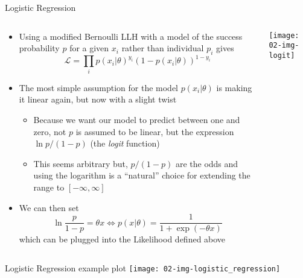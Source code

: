   \begin{frame}{Logistic Regression}
    \begin{columns}
      \begin{column}{0.65\textwidth}
        \begin{itemize}
          \item Using a modified Bernoulli LLH with a model of the success probability $p$ for a given $x_i$ rather than individual $p_i$ gives
          \begin{equation*}
            \mathcal{L} = \prod_i
              p(x_i | \theta)^{y_i} (1 − p(x_i | \theta))^{1 − y_i}
          \end{equation*}
          \item The most simple assumption for the model $p(x_i | \theta)$ is making it linear again, but now with a slight twist
          \begin{itemize}
            \item Because we want our model to predict between one and zero, not $p$ is assumed to be linear, but the expression $\ln{p / (1 - p)}$ (the \emph{logit} function)
            \item This seems arbitrary but, $p / (1 - p)$ are the odds and using the logarithm is a \enquote{natural} choice for extending the range to $[-\infty, \infty]$
          \end{itemize}
          \item We can then set
            \begin{equation}
              \ln \frac{p}{1 - p} = \theta x \Leftrightarrow
                p(x | \theta) = \frac{1}{1 + \exp(-\theta x)}
            \end{equation}
            which can be plugged into the Likelihood defined above
        \end{itemize}
      \end{column}
      \begin{column}{0.35\textwidth}
        \vspace{1em}

        \texttt{[image: 02-img-logit]}
      \end{column}
    \end{columns}
  \end{frame}

  \begin{frame}{Logistic Regression example plot}
    \texttt{[image: 02-img-logistic\_regression]}
  \end{frame}

